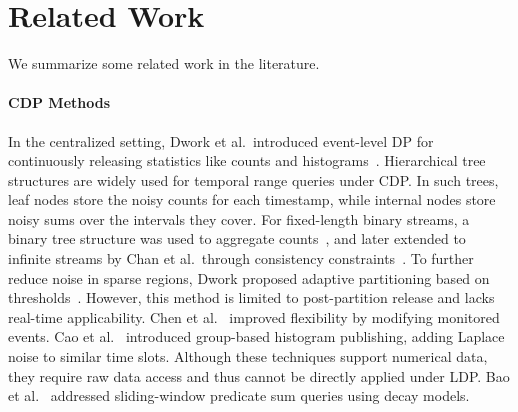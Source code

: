 \documentclass[acmsmall]{acmart}
\begin{document}
\section{Related Work}
\label{sec:related}

We summarize some related work in the literature.

\paragraph{CDP Methods}
In the centralized setting, Dwork et al.~introduced event-level DP for
continuously releasing statistics like counts and histograms~\cite{Dwork2006}.
Hierarchical tree structures are widely used for temporal range queries under CDP. In such trees, leaf nodes store the noisy counts for each timestamp, while internal nodes store noisy sums over the intervals they cover.
For fixed-length binary streams, a binary tree structure was used to aggregate
counts~\cite{Dwork2010}, and later extended to infinite streams by Chan et
al.~through consistency constraints~\cite{Chan2011}.
To further reduce noise in sparse regions, Dwork proposed adaptive partitioning
based on thresholds~\cite{Dwork2015}.
However, this method is limited to post-partition release and lacks real-time
applicability.
Chen et al.~\cite{Chen2017} improved flexibility by modifying monitored events.
Cao et al.~\cite{Cao2015} introduced group-based histogram publishing, adding
Laplace noise to similar time slots.
Although these techniques support numerical data, they require raw data access
and thus cannot be directly applied under LDP.
Bao et al.~\cite{Bolot2013} addressed sliding-window predicate sum queries using
decay models.
\end{document}
